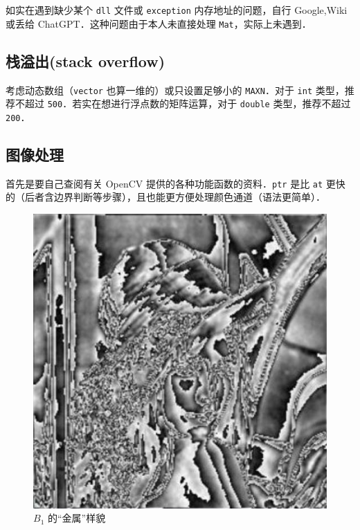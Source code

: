 \documentclass[12pt,a4paper,twoside]{ctexart}
\numberwithin{figure}{section}
\numberwithin{equation}{section}
\begin{document}
如实在遇到缺少某个 \verb|dll| 文件或 \verb|exception| 内存地址的问题，自行 Google,Wiki 或丢给 ChatGPT．这种问题由于本人未直接处理 \verb|Mat|，实际上未遇到．

\subsection{栈溢出(stack overflow)}
考虑动态数组（\verb|vector| 也算一维的）或只设置足够小的 \verb|MAXN|．对于 \verb|int| 类型，推荐不超过 \verb|500|．若实在想进行浮点数的矩阵运算，对于 \verb|double| 类型，推荐不超过 \verb|200|．




\subsection{图像处理}
首先是要自己查阅有关 OpenCV 提供的各种功能函数的资料．\verb|ptr| 是比 \verb|at| 更快的（后者含边界判断等步骤），且也能更方便处理颜色通道（语法更简单）．

\begin{figure}[ht]
    \centering
    \includegraphics[width=.3\textwidth]{metal.png}
    \caption{$B_1$ 的“金属”样貌}
\end{figure}
\end{document}
